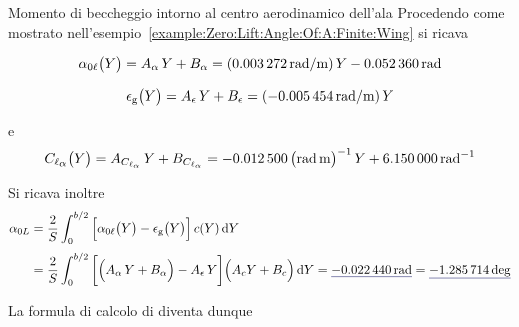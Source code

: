 \documentclass[[12pt,twoside]{book}
\begin{document}
\begin{myExampleX}{Momento di beccheggio intorno al centro aerodinamico dell'ala}{}
Procedendo come mostrato nell'esempio~\ref{example:Zero:Lift:Angle:Of:A:Finite:Wing}
si ricava

\[
\alpha_{0\ell} \big( Y \big) = A_{\alpha} \, Y + B_{\alpha}
  = (\SI[round-precision=5]{\myCoeffAAeroTwistWingRADMT}{\radian/\metre}) \, Y
    \SI[round-precision=4]{\myAlphaZeroLiftRootWingRAD}{\radian}
\]

\[
\epsilon_\mathrm{g} \big( Y \big) = A_{\epsilon} \, Y + B_{\epsilon}
  = (\SI[round-precision=5]{\myCoeffATwistWingRADMT}{\radian/\metre}) \, Y
\]

\noindent
e
\[
C_{\ell_\mathlarger{\alpha}} \big( Y \big) = A_{C_{\ell_\alpha}} \, Y + B_{C_{\ell_\alpha}}
  = \SI[round-precision=5]{\myCoeffAClalphaWingRADMT}{\big(\radian\,\metre\big)^{-1}} \, Y
    + \SI[round-precision=3]{\myCoeffBClalphaWingRAD}{\radian^{-1}}
\]

Si ricava inoltre
\[
\begin{split}
\alpha_{0L} 
  & {}= \frac{2}{S} \int_0^{b/2} 
    \Big[ 
      \alpha_{0\ell}\big(Y\big) - \epsilon_\mathrm{g}\big(Y\big) 
    \Big] \, c(Y) \diff{Y}
\\[3pt]
  & {}= \frac{2}{S} \int_0^{b/2} 
    \bigg[ \Big( A_{\alpha} \, Y + B_{\alpha} \Big) - A_{\epsilon} \, Y \bigg] \Big( A_c Y + B_c \Big)
      \diff{Y}
  = \mathunderline{mydarkblue}{ \SI[round-precision=4]{\myAlphaZeroLiftWingRAD}{\radian} }
  = \mathunderline{mydarkblue}{ \SI[round-precision=1]{\myAlphaZeroLiftWingDEG}{\deg} }
\end{split}
\]

La formula di calcolo di  diventa dunque


\end{myExampleX}
\end{document}
